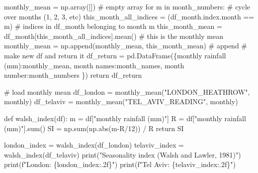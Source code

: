 \documentclass[
  letterpaper,
  DIV=11,
  numbers=noendperiod]{scrreprt}
\newenvironment{Shaded}{\begin{snugshade}}{\end{snugshade}}
\newcommand{\BuiltInTok}[1]{\textcolor[rgb]{0.00,0.23,0.31}{#1}}
\newcommand{\CommentTok}[1]{\textcolor[rgb]{0.37,0.37,0.37}{#1}}
\newcommand{\ControlFlowTok}[1]{\textcolor[rgb]{0.00,0.23,0.31}{#1}}
\newcommand{\DecValTok}[1]{\textcolor[rgb]{0.68,0.00,0.00}{#1}}
\newcommand{\KeywordTok}[1]{\textcolor[rgb]{0.00,0.23,0.31}{#1}}
\newcommand{\NormalTok}[1]{\textcolor[rgb]{0.00,0.23,0.31}{#1}}
\newcommand{\OperatorTok}[1]{\textcolor[rgb]{0.37,0.37,0.37}{#1}}
\newcommand{\SpecialCharTok}[1]{\textcolor[rgb]{0.37,0.37,0.37}{#1}}
\newcommand{\SpecialStringTok}[1]{\textcolor[rgb]{0.13,0.47,0.30}{#1}}
\newcommand{\StringTok}[1]{\textcolor[rgb]{0.13,0.47,0.30}{#1}}
\begin{document}
\begin{Shaded}
\begin{Highlighting}[]
\NormalTok{    monthly\_mean }\OperatorTok{=}\NormalTok{ np.array([])  }\CommentTok{\# empty array}
    \ControlFlowTok{for}\NormalTok{ m }\KeywordTok{in}\NormalTok{ month\_numbers:      }\CommentTok{\# cycle over months (1, 2, 3, etc)}
\NormalTok{        this\_month\_all\_indices }\OperatorTok{=}\NormalTok{ (df\_month.index.month }\OperatorTok{==}\NormalTok{ m)       }\CommentTok{\# indices in df\_month belonging to month m}
\NormalTok{        this\_month\_mean }\OperatorTok{=}\NormalTok{ df\_month[this\_month\_all\_indices].mean()  }\CommentTok{\# this is the monthly mean}
\NormalTok{        monthly\_mean }\OperatorTok{=}\NormalTok{ np.append(monthly\_mean, this\_month\_mean)    }\CommentTok{\# append}
    \CommentTok{\# make new df and return it}
\NormalTok{    df\_return }\OperatorTok{=}\NormalTok{ pd.DataFrame(\{}\StringTok{\textquotesingle{}monthly rainfall (mm)\textquotesingle{}}\NormalTok{:monthly\_mean,}
                              \StringTok{\textquotesingle{}month names\textquotesingle{}}\NormalTok{:month\_names,}
                              \StringTok{\textquotesingle{}month number\textquotesingle{}}\NormalTok{:month\_numbers}
\NormalTok{                            \})}
    \ControlFlowTok{return}\NormalTok{ df\_return}

\CommentTok{\# load monthly mean}
\NormalTok{df\_london }\OperatorTok{=}\NormalTok{ monthly\_mean(}\StringTok{"LONDON\_HEATHROW"}\NormalTok{, }\StringTok{\textquotesingle{}monthly\textquotesingle{}}\NormalTok{)}
\NormalTok{df\_telaviv }\OperatorTok{=}\NormalTok{ monthly\_mean(}\StringTok{"TEL\_AVIV\_READING"}\NormalTok{, }\StringTok{\textquotesingle{}monthly\textquotesingle{}}\NormalTok{)}
\end{Highlighting}
\end{Shaded}

\begin{Shaded}
\begin{Highlighting}[]
\KeywordTok{def}\NormalTok{ walsh\_index(df):}
\NormalTok{    m }\OperatorTok{=}\NormalTok{ df[}\StringTok{"monthly rainfall (mm)"}\NormalTok{]}
\NormalTok{    R }\OperatorTok{=}\NormalTok{ df[}\StringTok{"monthly rainfall (mm)"}\NormalTok{].}\BuiltInTok{sum}\NormalTok{()}
\NormalTok{    SI }\OperatorTok{=}\NormalTok{ np.}\BuiltInTok{sum}\NormalTok{(np.}\BuiltInTok{abs}\NormalTok{(m}\OperatorTok{{-}}\NormalTok{R}\OperatorTok{/}\DecValTok{12}\NormalTok{)) }\OperatorTok{/}\NormalTok{ R}
    \ControlFlowTok{return}\NormalTok{ SI}

\NormalTok{london\_index }\OperatorTok{=}\NormalTok{ walsh\_index(df\_london)}
\NormalTok{telaviv\_index }\OperatorTok{=}\NormalTok{ walsh\_index(df\_telaviv)}
\BuiltInTok{print}\NormalTok{(}\StringTok{"Seasonality index (Walsh and Lawler, 1981)"}\NormalTok{)}
\BuiltInTok{print}\NormalTok{(}\SpecialStringTok{f"London: }\SpecialCharTok{\{}\NormalTok{london\_index}\SpecialCharTok{:.2f\}}\SpecialStringTok{"}\NormalTok{)}
\BuiltInTok{print}\NormalTok{(}\SpecialStringTok{f"Tel Aviv: }\SpecialCharTok{\{}\NormalTok{telaviv\_index}\SpecialCharTok{:.2f\}}\SpecialStringTok{"}\NormalTok{)}
\end{Highlighting}
\end{Shaded}
\end{document}
